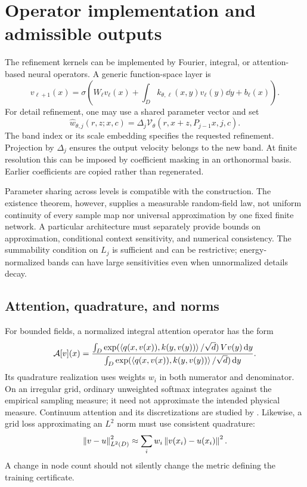 \section{Operator implementation and admissible outputs}\label{sec:architecture}
The refinement kernels can be implemented by Fourier, integral, or attention-based neural operators. A generic function-space layer is
\begin{equation}\label{eq:operator-layer}
 v_{\ell+1}(x)=\sigma\left(W_\ell v_\ell(x)
       +\int_D k_{\theta,\ell}(x,y)v_\ell(y)\dd y+b_\ell(x)\right).
\end{equation}
For detail refinement, one may use a shared parameter vector and set
\begin{equation}\label{eq:band-velocity}
 \widehat w_{\theta,j}(r,z;x,c)
 =\Delta_j\mathcal V_\theta(r,x+z,P_{j-1}x,j,c).
\end{equation}
The band index or its scale embedding specifies the requested refinement. Projection by $\Delta_j$ ensures the output velocity belongs to the new band. At finite resolution this can be imposed by coefficient masking in an orthonormal basis. Earlier coefficients are copied rather than regenerated.

Parameter sharing across levels is compatible with the construction. The existence theorem, however, supplies a measurable random-field law, not uniform continuity of every sample map nor universal approximation by one fixed finite network. A particular architecture must separately provide bounds on approximation, conditional context sensitivity, and numerical consistency. The summability condition on $L_j$ is sufficient and can be restrictive; energy-normalized bands can have large sensitivities even when unnormalized details decay.



\subsection{Attention, quadrature, and norms}
For bounded fields, a normalized integral attention operator has the form
\begin{equation}\label{eq:attention}
 \mathcal A[v](x)=
 \frac{\int_D\exp(\left\langle q(x,v(x)),k(y,v(y))\right\rangle/\sqrt d)\,Vv(y)\,\mathrm d y}
      {\int_D\exp(\left\langle q(x,v(x)),k(y,v(y))\right\rangle/\sqrt d)\,\mathrm d y}.
\end{equation}
Its quadrature realization uses weights $w_i$ in both numerator and denominator. On an irregular grid, ordinary unweighted softmax integrates against the empirical sampling measure; it need not approximate the intended physical measure. Continuum attention and its discretizations are studied by \citet{calvello2024}. Likewise, a grid loss approximating an $L^2$ norm must use consistent quadrature:
\begin{equation}
 \left\lVert v-u\right\rVert_{L^2(D)}^2\approx\sum_iw_i\left\lVert v(x_i)-u(x_i)\right\rVert^2.
\end{equation}
A change in node count should not silently change the metric defining the training certificate.

